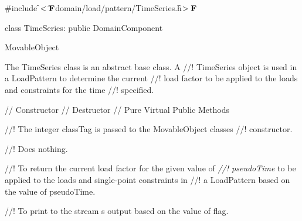 
\indent \#include \f$<\tilde{ }{\bf F}$domain/load/pattern/TimeSeries.h\f$>{\bf F}$

\indent class TimeSeries: public DomainComponent

\indent MovableObject
\indent{}

\indent The TimeSeries class is an abstract base class. A
//! TimeSeries object is used in a LoadPattern to determine the current
//! load factor to be applied to the loads and constraints for the time
//! specified. 

\indent // Constructor 
\indent // Destructor 
\indent // Pure Virtual Public Methods 

//! The integer \p classTag is passed to the MovableObject classes
//! constructor.

//! Does nothing.

//! To return the current load factor for the given value of {\em
//! pseudoTime} to be applied to the loads and single-point constraints in
//! a LoadPattern based on the value of \p pseudoTime.

//! To print to the stream \p s output based on the value of \p flag.
